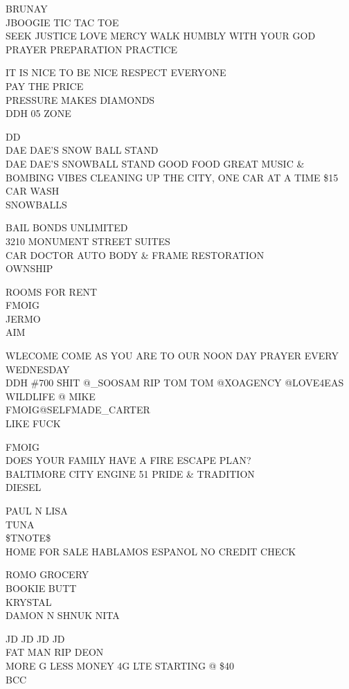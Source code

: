 \documentclass[10pt,letterpaper]{article}
\begin{document}
BRUNAY\\
JBOOGIE TIC TAC TOE\\
SEEK JUSTICE LOVE MERCY WALK HUMBLY WITH YOUR GOD\\
PRAYER PREPARATION PRACTICE

IT IS NICE TO BE NICE RESPECT EVERYONE\\
PAY THE PRICE\\
PRESSURE MAKES DIAMONDS\\
DDH 05 ZONE

DD\\
DAE DAE'S SNOW BALL STAND\\
DAE DAE'S SNOWBALL STAND GOOD FOOD GREAT MUSIC \& BOMBING VIBES CLEANING UP THE CITY, ONE CAR AT A TIME \$15 CAR WASH\\
SNOWBALLS

BAIL BONDS UNLIMITED\\
3210 MONUMENT STREET SUITES\\
CAR DOCTOR AUTO BODY \& FRAME RESTORATION\\
OWNSHIP

ROOMS FOR RENT\\
FMOIG\\
JERMO\\
AIM

WLECOME COME AS YOU ARE TO OUR NOON DAY PRAYER EVERY WEDNESDAY\\
DDH \#700 SHIT @\_SOOSAM RIP TOM TOM @XOAGENCY @LOVE4EAS WILDLIFE @ MIKE\\
FMOIG@SELFMADE\_CARTER\\
LIKE FUCK

FMOIG\\
DOES YOUR FAMILY HAVE A FIRE ESCAPE PLAN?\\
BALTIMORE CITY ENGINE 51 PRIDE \& TRADITION\\
DIESEL

PAUL N LISA\\
TUNA\\
\$TNOTE\$\\
HOME FOR SALE HABLAMOS ESPANOL NO CREDIT CHECK

ROMO GROCERY\\
BOOKIE BUTT\\
KRYSTAL\\
DAMON N SHNUK NITA

JD JD JD JD\\
FAT MAN RIP DEON\\
MORE G LESS MONEY 4G LTE STARTING @ \$40\\
BCC
\end{document}
